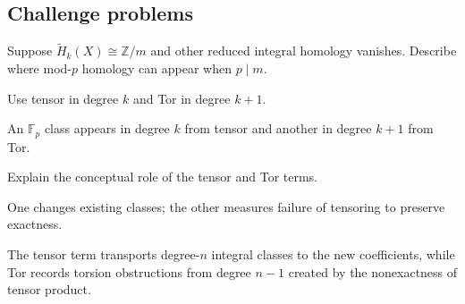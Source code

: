 \subsection*{Challenge problems}

\begin{exercise}\label{exr:viii26-ped-15}
Suppose $\widetilde H_k(X)\cong\mathbb Z/m$ and other reduced integral homology vanishes. Describe where mod-$p$ homology can appear when $p\mid m$.
\end{exercise}
\begin{hint}
Use tensor in degree $k$ and Tor in degree $k+1$.
\end{hint}
\begin{solution}
An $\mathbb F_p$ class appears in degree $k$ from tensor and another in degree $k+1$ from Tor.
\end{solution}

\begin{exercise}\label{exr:viii26-ped-16}
Explain the conceptual role of the tensor and Tor terms.
\end{exercise}
\begin{hint}
One changes existing classes; the other measures failure of tensoring to preserve exactness.
\end{hint}
\begin{solution}
The tensor term transports degree-$n$ integral classes to the new coefficients, while Tor records torsion obstructions from degree $n-1$ created by the nonexactness of tensor product.
\end{solution}

